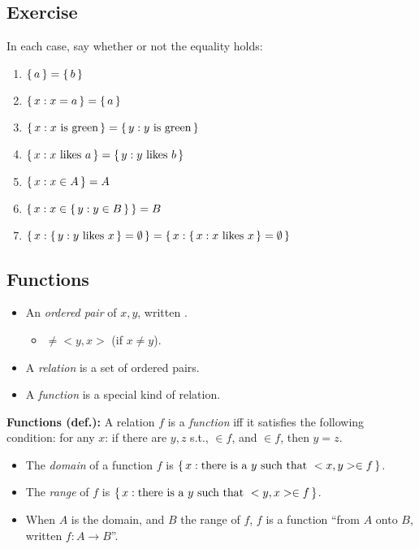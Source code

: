 \documentclass[letterpaper,parskip=half]{scrartcl}
\begin{document}
\subsection{Exercise}
\label{sec:org86e42e8}

In each case, say whether or not the equality holds:

\begin{enumerate}
\item \(\set{a} = \set{b}\)
\item \(\set{x : x = a} = \set{a}\)
\item \(\set{x : x\text{ is green} } = \set{y : y\text{ is green} }\)
\item \(\set{x : x\text{ likes }a } = \set{y : y\text{ likes }b }\)
\item \(\set{x : x \in A} = A\)
\item \(\set{x : x \in  \set{y : y \in  B}} = B\)
\item \(\set{x : \set{y : y\text{ likes }x } = \emptyset } = \set{x : \set{x : x\text{ likes }x } = \emptyset }\)
\end{enumerate}
\subsection{Functions}
\label{sec:orge504679}

\begin{itemize}
\item An \emph{ordered pair} of \(x,y\), written \(<x,y>\).
\begin{itemize}
\item \(<x,y> \neq <y,x>\) (if \(x \neq y\)).
\end{itemize}
\item A \emph{relation} is a set of ordered pairs.
\item A \emph{function} is a special kind of relation.
\end{itemize}

\begin{exe}
\ex \textbf{Functions (def.):} A relation \(f\) is a \emph{function} iff it satisfies the following condition: for any \(x\): if there are \(y,z\) s.t., \(<x,y> \in f\), and \(<x,z> \in  f\), then \(y = z\).
\label{orgd003318}
\end{exe}

\begin{itemize}
\item The \emph{domain} of a function \(f\) is \(\set{x : \text{there is a }y\text{ such that }<x,y> \in f  }\).
\item The \emph{range} of \(f\) is \(\set{x : \text{there is a }y\text{ such that }<y,x> \in  f  }\).
\item When \(A\) is the domain, and \(B\) the range of \(f\), \(f\) is a function ``from \(A\) onto \(B\), written \(f : A \rightarrow B\)''.
\end{itemize}
\end{document}
